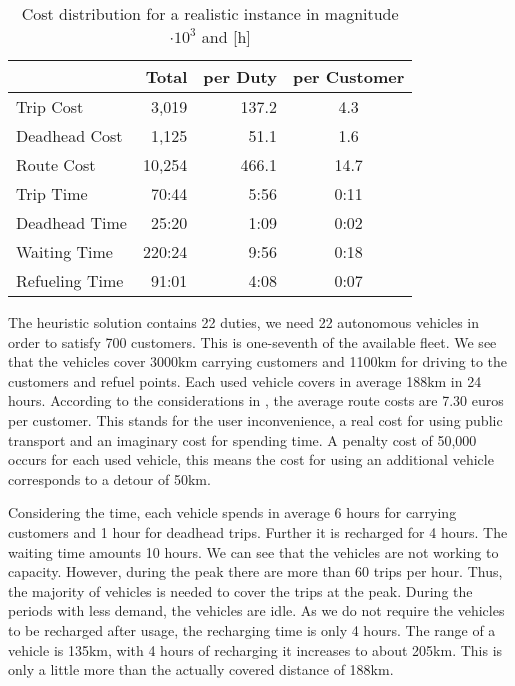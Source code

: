 \begin{table}[htb]
	\centering
	\begin{tabular}{l|rrc}
		\toprule
		& Total  & per Duty & per Customer \\
		\midrule
		Trip Cost     &  3,019 & 137.2 &  4.3 \\
		Deadhead Cost &  1,125 &  51.1 &  1.6 \\
		Route Cost    & 10,254 & 466.1 & 14.7 \\
		\midrule
		Trip Time      &  70:44 & 5:56 & 0:11 \\
		Deadhead Time  &  25:20 & 1:09 & 0:02 \\
		Waiting Time   & 220:24 & 9:56 & 0:18 \\
		Refueling Time &  91:01 & 4:08 & 0:07 \\
		\bottomrule
	\end{tabular}
	\caption{Cost distribution for a realistic instance in magnitude $\cdot 10^3$ and [h]}
	\label{tab:results:realistic}
\end{table}

The heuristic solution contains 22 duties, \ie we need 22 autonomous vehicles in order to satisfy 700 customers. This is one-seventh of the available fleet. We see that the vehicles cover 3000km carrying customers and 1100km for driving to the customers and refuel points. Each used vehicle covers in average 188km in 24 hours. According to the considerations in , the average route costs are 7.30 euros per customer. This stands for the user inconvenience, \ie a real cost for using public transport and an imaginary cost for spending time. A penalty cost of 50,000 occurs for each used vehicle, this means the cost for using an additional vehicle corresponds to a detour of 50km.

Considering the time, each vehicle spends in average 6 hours for carrying customers and 1 hour for deadhead trips. Further it is recharged for 4 hours. The waiting time amounts 10 hours. We can see that the vehicles are not working to capacity. However, during the peak there are more than 60 trips per hour. Thus, the majority of vehicles is needed to cover the trips at the peak. During the periods with less demand, the vehicles are idle. As we do not require the vehicles to be recharged after usage, the recharging time is only 4 hours. The range of a vehicle is 135km, with 4 hours of recharging it increases to about 205km. This is only a little more than the actually covered distance of 188km.

